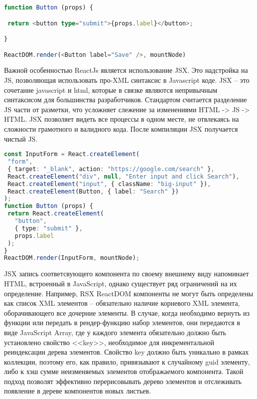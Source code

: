 \begin{lstlisting}[language=TypeScript, label=lst:domain:typescript]
function Button (props) {

 return <button type="submit">{props.label}</button>;

}

ReactDOM.render(<Button label="Save" />, mountNode)
\end{lstlisting}

Важной особенностью ReactJs\cite{react2}\cite{react3} является использование JSX. Это надстройка на JS, позволяющая использовать про-XML синтаксис в 
Javascript коде. JSX – это сочетание javascript и html, которые в связке являются непривычным синтаксисом для большинства разработчиков. 
Стандартом считается разделение JS части от разметки, что усложняет слежение за изменениями HTML -> JS -> HTML. JSX позволяет видеть все процессы 
в одном месте, не отвлекаясь на сложности грамотного и валидного кода. После компиляции JSX получается чистый JS.

\begin{lstlisting}[language=TypeScript, label=lst:domain:typescript]
const InputForm = React.createElement(
 "form",
 { target: "_blank", action: "https://google.com/search" },
 React.createElement("div", null, "Enter input and click Search"),
 React.createElement("input", { className: "big-input" }),
 React.createElement(Button, { label: "Search" })
);
function Button (props) {
 return React.createElement(
   "button",
   { type: "submit" },
   props.label
 );
}
ReactDOM.render(InputForm, mountNode);
\end{lstlisting}

JSX запись соответсвующего компонента по своему внешнему виду напоминает HTML, встроенный в JavaScript, однако существует ряд ограничений на их определение.
Например, RSX ReactDOM компоненты не могут быть определены как список XML элементов -- обязательно наличие корневого XML элемента, оборачивающего все дочерние элементы.
В случае, когда необходимо вернуть из функции или передать в рендер-функцию набор элементов, они передаются в виде JavaScript Array, где у каждого элемента обязательно должно
быть установлено свойство <<key>>, необходимое для инкрементальной реиндексации дерева элементов. Свойство key должно быть уникально в рамках коллекции, поэтому его, как правило,
привязывают к случайному guid элементу, либо к хэш сумме неизменяемых элементов отображаемого компонента. Такой подход позволят эффективно перерисовывать дерево элементов
и отслеживать появление в дереве компонентов новых листьев.

